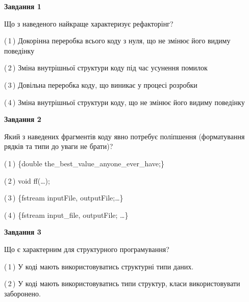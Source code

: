 \documentclass[10pt, ukrainian]{article}
\begin{document}
{
\begin {large}
{\begin {center}\textbf{Завдання 1}\end {center}}\par
Що з наведеного найкраще характеризує рефакторінг?\par
\vspace{2mm}



(\,1\,) Докорінна переробка всього коду з нуля,  що не змінює його видиму поведінку%



(\,2\,) Зміна внутрішньої структури коду під час усунення помилок%



(\,3\,) Довільна переробка коду, що виникає у процесі розробки%



(\,4\,) Зміна внутрішньої структури коду, що не змінює його видиму поведінку%


{\begin {center}\textbf{Завдання 2}\end {center}}\par
Який з наведених фрагментів коду явно потребує поліпшення (форматування рядків та типи до уваги не брати)?\par
\vspace{2mm}



(\,1\,) \{double the\_best\_value\_anyone\_ever\_have;\} %



(\,2\,) void ff(…);%



(\,3\,) \{fstream inputFile, outputFile;…\} %



(\,4\,) \{fstream input\_file, outputFile; …\}%


{\begin {center}\textbf{Завдання 3}\end {center}}\par
Що є характерним для структурного програмування?\par
\vspace{2mm}



(\,1\,) У коді мають використовуватись структурні типи даних. %



(\,2\,) У коді мають використовуватись типи структур, класи використовувати заборонено. %




\end{large}}
\end{document}

